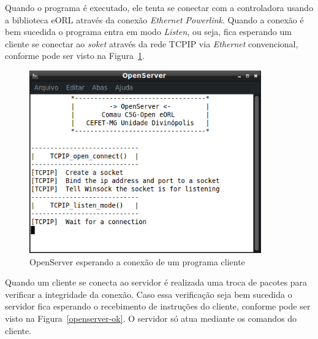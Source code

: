             Quando o programa é executado, ele tenta se conectar com a controladora usando a biblioteca \ac{eORL} através da conexão \textit{Ethernet Powerlink}. Quando a conexão é bem sucedida o programa entra em modo \textit{Listen}, ou seja, fica esperando um cliente se conectar ao \textit{soket} através da rede \ac{TCPIP} via \textit{Ethernet} convencional, conforme pode ser visto na Figura~\ref{openserver-wait}.
            
            \begin{figure}[ht]
                \centering
                \includegraphics[width=10cm]{imagens/Softwares/openserver-wait_.png}
                \small 
                \centering 
                \caption{OpenServer esperando a conexão de um programa cliente}
                \label{openserver-wait}
            \end{figure}
            
            Quando um cliente se conecta ao servidor é realizada uma troca de pacotes para verificar a integridade da conexão. Caso essa verificação seja bem sucedida o servidor fica esperando o recebimento de instruções do cliente, conforme pode ser visto na Figura~\ref{openserver-ok}. O servidor só atua mediante os comandos do cliente.
            
